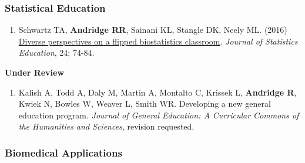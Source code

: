 \documentclass[
  english,
  letterpaper,
  DIV=11,
  numbers=noendperiod]{scrartcl}
\providecommand{\tightlist}{%
  \setlength{\itemsep}{0pt}\setlength{\parskip}{0pt}}
\begin{document}
\subsubsection{Statistical Education}\label{statistical-education}

\begin{enumerate}
\def\labelenumi{\arabic{enumi}.}
\tightlist
\item
  Schwartz TA, \textbf{Andridge RR}, Sainani KL, Stangle DK, Neely ML.
  (2016) \href{https://doi.org/10.1080/10691898.2016.1192362}{Diverse
  perspectives on a flipped biostatistics classroom}. \emph{Journal of
  Statistics Education}, 24; 74-84.
\end{enumerate}

\textbf{Under Review}

\begin{enumerate}
\def\labelenumi{\arabic{enumi}.}
\tightlist
\item
  Kalish A, Todd A, Daly M, Martin A, Montalto C, Krissek L,
  \textbf{Andridge R}, Kwiek N, Bowles W, Weaver L, Smith WR. Developing
  a new general education program. \emph{Journal of General Education: A
  Curricular Commons of the Humanities and Sciences}, revision
  requested.
\end{enumerate}

\subsubsection{Biomedical Applications}\label{biomedical-applications}
\end{document}
